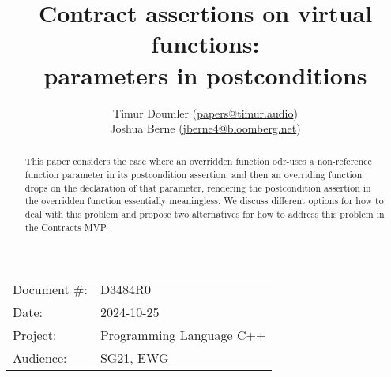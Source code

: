 

 \usepackage[bottom]{footmisc} 

 \usepackage{longtable}


\usepackage{tikz,lipsum,lmodern}
\usepackage[most]{tcolorbox}



\usepackage{titlesec}
\usepackage{tocloft}


\newcommand{\changelocaltocdepth}[1]{%
  \addtocontents{toc}{\protect\setcounter{tocdepth}{#1}}%
  \setcounter{tocdepth}{#1}%
}

\setcounter{tocdepth}{3}



\title{Contract assertions on virtual functions: \\  parameters in postconditions}
\author{
Timur Doumler \small(\href{mailto:papers@timur.audio}{papers@timur.audio}) \\
Joshua Berne \small(\href{mailto:jberne4@bloomberg.net}{jberne4@bloomberg.net}) \\
}
\date{}
\maketitle

\begin{tabular}{ll}
Document \#: & D3484R0 \\
Date: &2024-10-25 \\
Project: & Programming Language C++ \\
Audience: & SG21, EWG
\end{tabular}

\begin{abstract}
This paper considers the case where an overridden function odr-uses a non-reference function parameter in its postcondition assertion, and then an overriding function drops  on the declaration of that parameter, rendering the postcondition assertion in the overridden function essentially meaningless. We discuss different options for how to deal with this problem and propose two alternatives for how to address this problem in the Contracts MVP \cite{P2900R10}.
\end{abstract}

